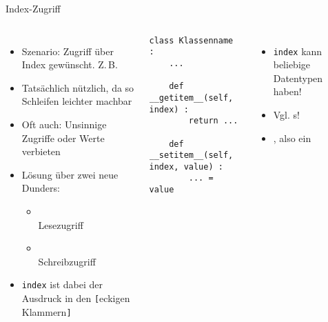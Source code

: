 \begin{frame}[fragile]{Index-Zugriff}
%
\begin{columns}[T]
\begin{itemize}
\item Szenario: Zugriff über Index gewünscht. Z.\,B.  \thus {}
\item Tatsächlich nützlich, da so Schleifen leichter machbar
\item Oft auch: Unsinnige Zugriffe oder Werte verbieten
\item Lösung über zwei neue Dunders:
	\begin{itemize}
	\item {} \\ Lesezugriff
	\item {} \\ Schreibzugriff
	\end{itemize}
\item \texttt{index} ist dabei der Ausdruck in den \texttt{[}eckigen Klammern\texttt{]}
\end{itemize}
%
\begin{codebox}
\begin{verbatim}
class Klassenname :
    ...
    
    def __getitem__(self, index) :
        return ...
    
    def __setitem__(self, index, value) :
        ... = value
\end{verbatim}
\end{codebox}
%
\begin{itemize}
\item \texttt{index} kann beliebige Datentypen haben!
\item Vgl. s!
\item {} \Thus {}, also ein 
\end{itemize}
\end{columns}
%
\end{frame}


